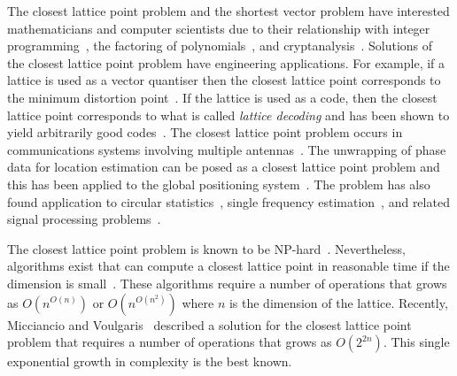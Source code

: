 \documentclass[final,leqno]{siamltex}
\begin{document}
The closest lattice point problem and the shortest vector problem have interested mathematicians and computer scientists due to their relationship with integer programming~\cite{Lenstra_integerprogramming1983,Kannan1987_fast_general_np,Babai1986}, the factoring of polynomials~\cite{Lenstra1982}, and cryptanalysis~\cite{Joux_toolbox_cryptanal1998,NyguyenStern_two_faces_crypto,Micciancio_lattice_based_post_quantum_crypto}.  
Solutions of the closest lattice point problem have engineering applications.  For example, if a lattice is used as a vector quantiser then the closest lattice point corresponds to the minimum distortion point~\cite{Conway1983VoronoiCodes,Conway1982VoronoiRegions,Conway1982FastQuantDec}.  If the lattice is used as a code, then the closest lattice point corresponds to what is called \emph{lattice decoding} and has been shown to yield arbitrarily good codes~\cite{Erex2004_lattice_decoding,Erez2005}.  The closest lattice point problem occurs in communications systems involving multiple antennas~\cite{Ryan2008,Wubben_2011}.  The unwrapping of phase data for location estimation can be posed as a closest lattice point problem and this has been applied to the global positioning system~\cite{Teunissen_GPS_1995,Hassibi_GPS_1998}.  The problem has also found application to circular statistics~\cite{McKilliam_mean_dir_est_sq_arc_length2010}, single frequency estimation~\cite{McKilliamFrequencyEstimationByPhaseUnwrapping2009}, and related signal processing problems~\cite{McKilliam2007,Clarkson2007,McKilliam2009IndentifiabliltyAliasingPolyphase,Quinn_sparse_noisy_SSP_2012,McKilliam_pps_unwrapping_tsp_2014}.

The closest lattice point problem is known to be NP-hard~\cite{micciancio_hardness_2001, Dinur2003_approximating_CVP_NP_hard,Regev_2004_inappox_lattice_with_preprocessing,feige_inapproximability_2004,Jalden2005_sphere_decoding_complexity}.  Nevertheless, algorithms exist that can compute a closest lattice point in reasonable time if the dimension is small~\cite{Pohst_sphere_decoder_1981,Kannan1987_fast_general_np,Agrell2002}.  These algorithms require a number of operations that grows as $O(n^{O(n)})$ or $O(n^{O(n^2)})$ where $n$ is the dimension of the lattice.  Recently, Micciancio and Voulgaris~\cite{MicciancioVoulgaris_deterministic_jv_2013} described a solution for the closest lattice point problem that requires a number of operations that grows as $O(2^{2n})$.  This single exponential growth in complexity is the best known. 
\end{document}
